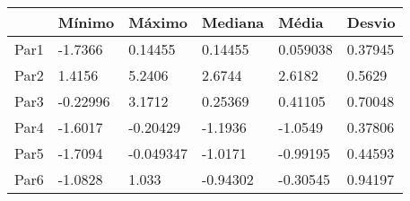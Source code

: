 \begin{tabular}{llllll}
& Mínimo & Máximo & Mediana & Média & Desvio \\ 
\hline 
Par1 & -1.7366 & 0.14455 & 0.14455 & 0.059038 & 0.37945 \\ 
Par2 & 1.4156 & 5.2406 & 2.6744 & 2.6182 & 0.5629 \\ 
Par3 & -0.22996 & 3.1712 & 0.25369 & 0.41105 & 0.70048 \\ 
Par4 & -1.6017 & -0.20429 & -1.1936 & -1.0549 & 0.37806 \\ 
Par5 & -1.7094 & -0.049347 & -1.0171 & -0.99195 & 0.44593 \\ 
Par6 & -1.0828 & 1.033 & -0.94302 & -0.30545 & 0.94197 \\ 
\hline 
\end{tabular}